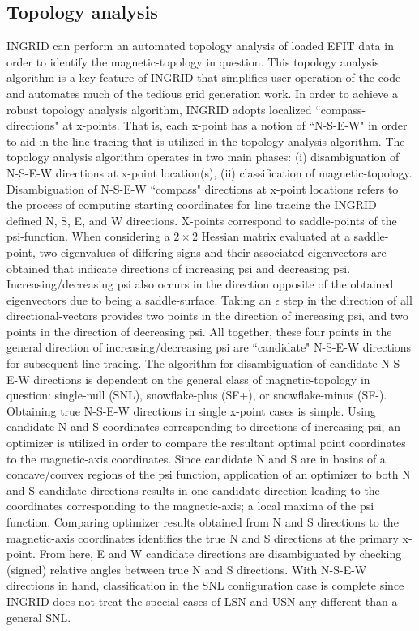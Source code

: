 \subsection{Topology analysis}
INGRID can perform an automated topology analysis of loaded EFIT data in order to identify the magnetic-topology in question. This topology analysis algorithm is a key feature of INGRID that simplifies user operation of the code and automates much of the tedious grid generation work. In order to achieve a robust topology analysis algorithm, INGRID adopts localized ``compass-directions" at x-points. That is, each x-point has a notion of ``N-S-E-W" in order to aid in the line tracing that is utilized in the topology analysis algorithm. The topology analysis algorithm operates in two main phases: (i) disambiguation of N-S-E-W directions at x-point location(s), (ii) classification of magnetic-topology.\\ \indent
Disambiguation of N-S-E-W ``compass" directions at x-point locations refers to the process of computing starting coordinates for line tracing the INGRID defined N, S, E, and W directions. X-points correspond to saddle-points of the psi-function. When considering a $2\times2$ Hessian matrix evaluated at a saddle-point, two eigenvalues of differing signs and their associated eigenvectors are obtained that indicate directions of increasing psi and decreasing psi. Increasing/decreasing psi also occurs in the direction opposite of the obtained eigenvectors due to being a saddle-surface. Taking an $\epsilon$ step in the direction of all directional-vectors provides two points in the direction of increasing psi, and two points in the direction of decreasing psi. All together, these four points in the general direction of increasing/decreasing psi are ``candidate" N-S-E-W directions for subsequent line tracing. The algorithm for disambiguation of candidate N-S-E-W directions is dependent on the general class of magnetic-topology in question: single-null (SNL), snowflake-plus (SF+), or snowflake-minus (SF-).\\ \indent
Obtaining true N-S-E-W directions in single x-point cases is simple. Using candidate N and S coordinates corresponding to directions of increasing psi, an optimizer is utilized in order to compare the resultant optimal point coordinates to the magnetic-axis coordinates. Since candidate N and S are in basins of a concave/convex regions of the psi function, application of an optimizer to both N and S candidate directions results in one candidate direction leading to the coordinates corresponding to the magnetic-axis; a local maxima of the psi function. Comparing optimizer results obtained from N and S directions to the magnetic-axis coordinates identifies the true N and S directions at the primary x-point. From here, E and W candidate directions are disambiguated by checking (signed) relative angles between true N and S directions. With N-S-E-W directions in hand, classification in the SNL configuration case is complete since INGRID does not treat the special cases of LSN and USN any different than a general SNL.\\ \indent

